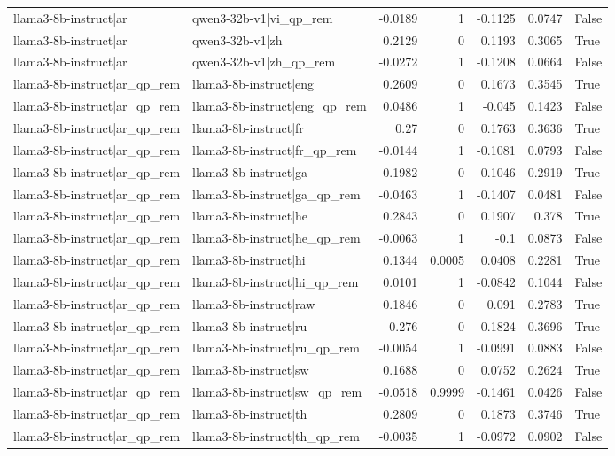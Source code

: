 \begin{table}
\begin{tabular}{l l r r r r l}
llama3-8b-instruct|ar & qwen3-32b-v1|vi_qp_rem & -0.0189 & 1 & -0.1125 & 0.0747 & False \\
llama3-8b-instruct|ar & qwen3-32b-v1|zh & 0.2129 & 0 & 0.1193 & 0.3065 & True \\
llama3-8b-instruct|ar & qwen3-32b-v1|zh_qp_rem & -0.0272 & 1 & -0.1208 & 0.0664 & False \\
llama3-8b-instruct|ar_qp_rem & llama3-8b-instruct|eng & 0.2609 & 0 & 0.1673 & 0.3545 & True \\
llama3-8b-instruct|ar_qp_rem & llama3-8b-instruct|eng_qp_rem & 0.0486 & 1 & -0.045 & 0.1423 & False \\
llama3-8b-instruct|ar_qp_rem & llama3-8b-instruct|fr & 0.27 & 0 & 0.1763 & 0.3636 & True \\
llama3-8b-instruct|ar_qp_rem & llama3-8b-instruct|fr_qp_rem & -0.0144 & 1 & -0.1081 & 0.0793 & False \\
llama3-8b-instruct|ar_qp_rem & llama3-8b-instruct|ga & 0.1982 & 0 & 0.1046 & 0.2919 & True \\
llama3-8b-instruct|ar_qp_rem & llama3-8b-instruct|ga_qp_rem & -0.0463 & 1 & -0.1407 & 0.0481 & False \\
llama3-8b-instruct|ar_qp_rem & llama3-8b-instruct|he & 0.2843 & 0 & 0.1907 & 0.378 & True \\
llama3-8b-instruct|ar_qp_rem & llama3-8b-instruct|he_qp_rem & -0.0063 & 1 & -0.1 & 0.0873 & False \\
llama3-8b-instruct|ar_qp_rem & llama3-8b-instruct|hi & 0.1344 & 0.0005 & 0.0408 & 0.2281 & True \\
llama3-8b-instruct|ar_qp_rem & llama3-8b-instruct|hi_qp_rem & 0.0101 & 1 & -0.0842 & 0.1044 & False \\
llama3-8b-instruct|ar_qp_rem & llama3-8b-instruct|raw & 0.1846 & 0 & 0.091 & 0.2783 & True \\
llama3-8b-instruct|ar_qp_rem & llama3-8b-instruct|ru & 0.276 & 0 & 0.1824 & 0.3696 & True \\
llama3-8b-instruct|ar_qp_rem & llama3-8b-instruct|ru_qp_rem & -0.0054 & 1 & -0.0991 & 0.0883 & False \\
llama3-8b-instruct|ar_qp_rem & llama3-8b-instruct|sw & 0.1688 & 0 & 0.0752 & 0.2624 & True \\
llama3-8b-instruct|ar_qp_rem & llama3-8b-instruct|sw_qp_rem & -0.0518 & 0.9999 & -0.1461 & 0.0426 & False \\
llama3-8b-instruct|ar_qp_rem & llama3-8b-instruct|th & 0.2809 & 0 & 0.1873 & 0.3746 & True \\
llama3-8b-instruct|ar_qp_rem & llama3-8b-instruct|th_qp_rem & -0.0035 & 1 & -0.0972 & 0.0902 & False \\

\end{tabular}
\end{table}
